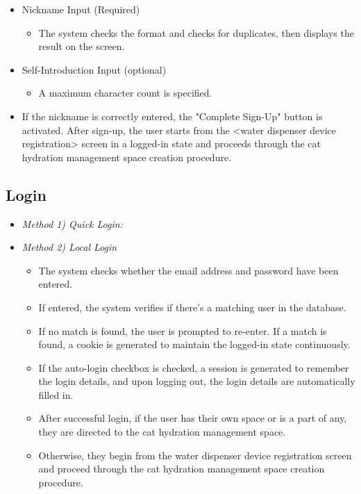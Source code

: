 \documentclass[conference]{IEEEtran}
\begin{document}
\begin{itemize}
\begin{itemize}
\begin{itemize}
            \end{itemize}
        \item Nickname Input (Required)
            \begin{itemize}
            \item The system checks the format and checks for duplicates, then displays the result on the screen.
            \end{itemize}
        \item Self-Introduction Input (optional)
            \begin{itemize}
            \item A maximum character count is specified.
            \end{itemize}
        \item If the nickname is correctly entered, the "Complete Sign-Up" button is activated. After sign-up, the user starts from the <water dispenser device registration> screen in a logged-in state and proceeds through the cat hydration management space creation procedure.\\
    \end{itemize}
\end{itemize}

\subsection{Login}
\begin{itemize}
\item{\emph{Method 1) Quick Login:}}
\item{\emph{Method 2) Local Login}}
    \begin{itemize}
        \item The system checks whether the email address and password have been entered.
        \item If entered, the system verifies if there's a matching user in the database.
        \item If no match is found, the user is prompted to re-enter. If a match is found, a cookie is generated to maintain the logged-in state continuously.
        \item If the auto-login checkbox is checked, a session is generated to remember the login details, and upon logging out, the login details are automatically filled in.
        \item After successful login, if the user has their own space or is a part of any, they are directed to the cat hydration management space.
        \item Otherwise, they begin from the water dispenser device registration screen and proceed through the cat hydration management space creation procedure.\\
    \end{itemize}
\end{itemize}
\end{document}
